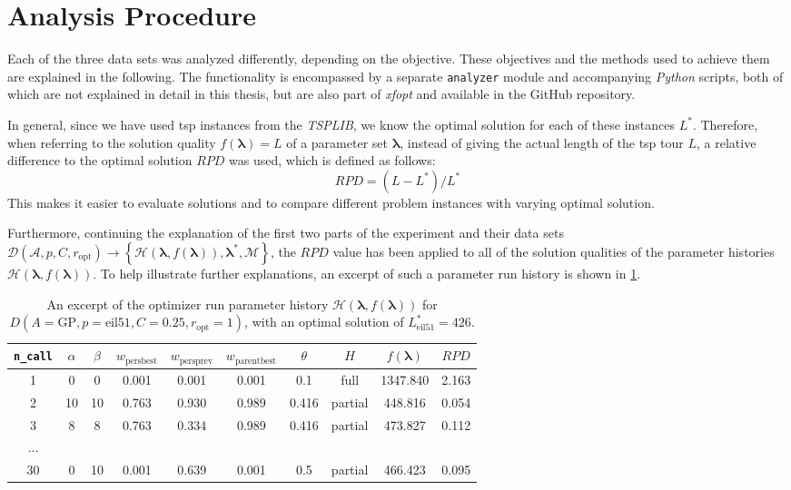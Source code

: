\section{Analysis Procedure}
\label{chap:analysis}

Each of the three data sets was analyzed differently, depending on the objective. These objectives and the methods used to achieve them are explained in the following. The functionality is encompassed by a separate \texttt{analyzer} module and accompanying \textit{Python} scripts, both of which are not explained in detail in this thesis, but are also part of \textit{\gls{xfopt}} and available in the GitHub repository. 

In general, since we have used \gls{tsp} instances from the \textit{TSPLIB}, we know the optimal solution for each of these instances $L^*$. Therefore, when referring to the solution quality $f(\mathbf{\lambda}) = L$ of a parameter set $\mathbf{\lambda}$, instead of giving the actual length of the \gls{tsp} tour $L$, a relative difference to the optimal solution $RPD$ was used, which is defined as follows:
\begin{equation}
	\label{eq:rpd}
	RPD = (L - L^*) / L^*
\end{equation}
This makes it easier to evaluate solutions and to compare different problem instances with varying optimal solution.

Furthermore, continuing the explanation of the first two parts of the experiment and their data sets $\mathcal{D}(\mathcal{A},p,C,r_\text{opt}) \to \left\lbrace \mathcal{H}(\mathbf{\lambda}, f(\mathbf{\lambda})), \mathbf{\lambda^*}, \mathcal{M} \right\rbrace$, the $RPD$ value has been applied to all of the solution qualities of the parameter histories $\mathcal{H}(\mathbf{\lambda}, f(\mathbf{\lambda}))$.
To help illustrate further explanations, an excerpt of such a parameter run history is shown in \cref{tab:part1-2-history}.

\begin{table}
	\centering
	\caption[An excerpt of the optimizer run parameter history]{An excerpt of the optimizer run parameter history $\mathcal{H}(\mathbf{\lambda}, f(\mathbf{\lambda}))$ for $D\left( A=\text{GP}, p=\text{eil51}, C=0.25, r_\text{opt} = 1\right) $, with an optimal solution of $L^*_\text{eil51}=426$.}
	\label{tab:part1-2-history}
	\begin{tabular}{c c c c c c c c c c}
		\hline
		\texttt{n\_call} & $\alpha$ & $\beta$ & $w_{\text{persbest}}$ & $w_{\text{persprev}}$& $w_{\text{parentbest}}$ & $\theta$ & $H$ & $f(\mathbf{\lambda})$ & $RPD$ \\ \hline
		1 & 0 & 0 & 0.001 & 0.001 & 0.001 & 0.1 & full & 1347.840 & 2.163\\
		2 & 10 & 10 & 0.763 & 0.930 & 0.989 & 0.416 & partial & 448.816 & 0.054 \\
		3 & 8 & 8 & 0.763 & 0.334 & 0.989 & 0.416 & partial & 473.827 &  0.112\\
		... & ~ & ~ & ~ & ~ & ~ & ~ & ~ & ~ & ~ \\
		30 & 0 & 10 & 0.001 & 0.639 & 0.001 & 0.5 & partial & 466.423 & 0.095\\ \hline
	\end{tabular}
\end{table}

